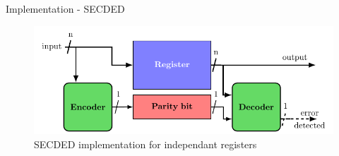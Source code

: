 \begin{frame}{Implementation - SECDED}
    \begin{figure}
        \centering
        \includegraphics[width=.8\textwidth, page=4]{src/4_strategies/img/archi_contremesures.pdf}
        \caption{SECDED implementation for independant registers}
        \label{fig:secded_implem_independant_register}
    \end{figure}
\end{frame}

